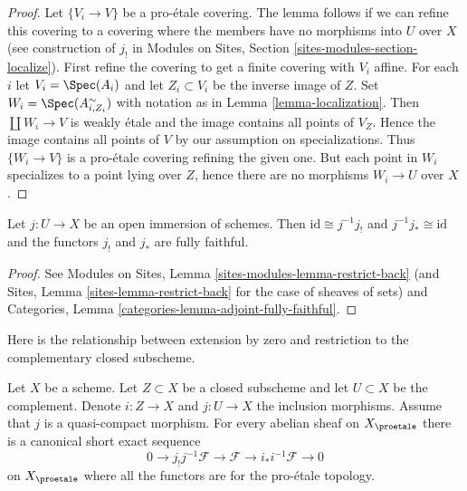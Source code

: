 \begin{proof}
Let $\{V_i \to V\}$ be a pro-\'etale covering. The lemma follows if we
can refine this covering to a covering where the members have no
morphisms into $U$ over $X$ (see construction of $j_!$ in
Modules on Sites, Section \ref{sites-modules-section-localize}).
First refine the covering to get a finite covering with $V_i$ affine.
For each $i$ let $V_i = \Spec(A_i)$ and let $Z_i \subset V_i$ be the
inverse image of $Z$.
Set $W_i = \Spec(A_{i, Z_i}^\sim)$ with notation as in
Lemma \ref{lemma-localization}.
Then $\coprod W_i \to V$ is weakly \'etale and the image contains all
points of $V_Z$. Hence the image contains all points of $V$ by
our assumption on specializations. Thus $\{W_i \to V\}$ is a
pro-\'etale covering refining the given one. But each point in $W_i$
specializes to a point lying over $Z$, hence there are no morphisms
$W_i \to U$ over $X$.
\end{proof}

\begin{lemma}
\label{lemma-open-immersion}
Let $j : U \to X$ be an open immersion of schemes.
Then $\text{id} \cong j^{-1}j_!$ and $j^{-1}j_* \cong \text{id}$
and the functors $j_!$ and $j_*$ are fully faithful.
\end{lemma}

\begin{proof}
See Modules on Sites, Lemma \ref{sites-modules-lemma-restrict-back}
(and Sites, Lemma \ref{sites-lemma-restrict-back} for the case
of sheaves of sets) and
Categories, Lemma \ref{categories-lemma-adjoint-fully-faithful}.
\end{proof}

\noindent
Here is the relationship between extension by zero and restriction
to the complementary closed subscheme.

\begin{lemma}
\label{lemma-ses-associated-to-open}
Let $X$ be a scheme. Let $Z \subset X$ be a closed subscheme and let
$U \subset X$ be the complement. Denote $i : Z \to X$ and $j : U \to X$
the inclusion morphisms. Assume that $j$ is a quasi-compact morphism.
For every abelian sheaf on $X_\proetale$ there is a canonical short exact
sequence
$$
0 \to j_!j^{-1}\mathcal{F} \to \mathcal{F} \to i_*i^{-1}\mathcal{F} \to 0
$$
on $X_\proetale$ where all the functors are for the pro-\'etale topology.
\end{lemma}


